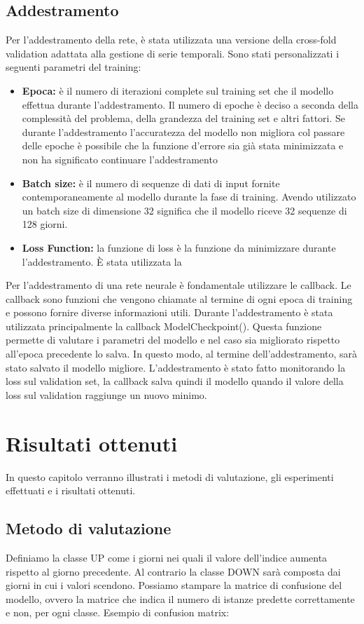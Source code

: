 \documentclass[12pt,a4paper,twoside,openright]{book}
\begin{document}
\section{Addestramento}
Per l’addestramento della rete, è stata utilizzata una versione della cross-fold validation adattata alla gestione di serie temporali. Sono stati personalizzati i seguenti parametri del training:
\begin{itemize}
    \item \textbf{Epoca:} è il numero di iterazioni complete sul training set che il modello effettua durante l’addestramento. Il numero di epoche è deciso a seconda della complessità del problema, della grandezza del training set e altri fattori. Se durante l’addestramento l’accuratezza del modello non migliora col passare delle epoche è possibile che la funzione d’errore sia già stata minimizzata e non ha significato continuare l’addestramento
    \item \textbf{Batch size:} è il numero di sequenze di dati di input fornite contemporaneamente al modello durante la fase di training. Avendo utilizzato un batch size di dimensione 32 significa che il modello riceve 32 sequenze di 128 giorni.
    \item \textbf{Loss Function:} la funzione di loss è la funzione da minimizzare durante l’addestramento. È stata utilizzata la
\end{itemize}
Per l’addestramento di una rete neurale è fondamentale utilizzare le callback. Le callback sono funzioni che vengono chiamate al termine di ogni epoca di training e possono fornire diverse informazioni utili. Durante l’addestramento è stata utilizzata principalmente la callback ModelCheckpoint(). Questa funzione permette di valutare i parametri del modello e nel caso sia migliorato rispetto all’epoca precedente lo salva. In questo modo, al termine dell’addestramento, sarà stato salvato il modello migliore.
L’addestramento è stato fatto monitorando la loss sul validation set, la callback salva quindi il modello quando il valore della loss sul validation raggiunge un nuovo minimo.

\chapter{Risultati ottenuti}
In questo capitolo verranno illustrati i metodi di valutazione, gli esperimenti effettuati e i risultati ottenuti.
\section{Metodo di valutazione}
Definiamo la classe UP come i giorni nei quali il valore dell’indice aumenta rispetto al giorno precedente. Al contrario la classe DOWN sarà composta dai giorni in cui i valori scendono.
Possiamo stampare la matrice di confusione del modello, ovvero la matrice che indica il numero di istanze predette correttamente e non, per ogni classe. Esempio di confusion matrix:
\end{document}
